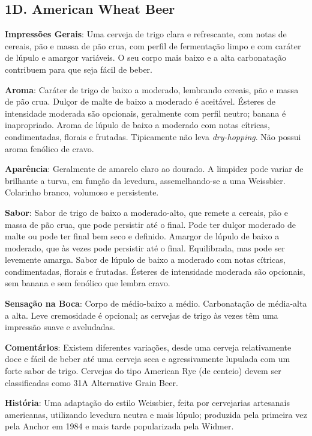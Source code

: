 \subsection*{1D. American Wheat Beer}
\textbf{Impressões Gerais}: Uma cerveja de trigo clara e refrescante, com notas de cereais, pão e massa de pão crua, com perfil de fermentação limpo e com caráter de lúpulo e amargor variáveis. O seu corpo mais baixo e a alta carbonatação contribuem para que seja fácil de beber.

\textbf{Aroma}: Caráter de trigo de baixo a moderado, lembrando cereais, pão e massa de pão crua. Dulçor de malte de baixo a moderado é aceitável. Ésteres de intensidade moderada são opcionais, geralmente com perfil neutro; banana é inapropriado. Aroma de lúpulo de baixo a moderado com notas cítricas, condimentadas, florais e frutadas. Tipicamente não leva \textit{dry-hopping}. Não possui aroma fenólico de cravo.

\textbf{Aparência}: Geralmente de amarelo claro ao dourado. A limpidez pode variar de brilhante a turva, em função da levedura, assemelhando-se a uma Weissbier. Colarinho branco, volumoso e persistente.

\textbf{Sabor}: Sabor de trigo de baixo a moderado-alto, que remete a cereais, pão e massa de pão crua, que pode persistir até o final. Pode ter dulçor moderado de malte ou pode ter final bem seco e definido. Amargor de lúpulo de baixo a moderado, que às vezes pode persistir até o final. Equilibrada, mas pode ser levemente amarga. Sabor de lúpulo de baixo a moderado com notas cítricas, condimentadas, florais e frutadas. Ésteres de intensidade moderada são opcionais, sem banana e sem fenólico que lembra cravo.

\textbf{Sensação na Boca}: Corpo de médio-baixo a médio. Carbonatação de média-alta a alta. Leve cremosidade é opcional; as cervejas de trigo às vezes têm uma impressão suave e aveludadas.

\textbf{Comentários}: Existem diferentes variações, desde uma cerveja relativamente doce e fácil de beber até uma cerveja seca e agressivamente lupulada com um forte sabor de trigo. Cervejas do tipo American Rye (de centeio) devem ser classificadas como 31A Alternative Grain Beer.

\textbf{História}: Uma adaptação do estilo Weissbier, feita por cervejarias artesanais americanas, utilizando levedura neutra e mais lúpulo; produzida pela primeira vez pela Anchor em 1984 e mais tarde popularizada pela Widmer.

